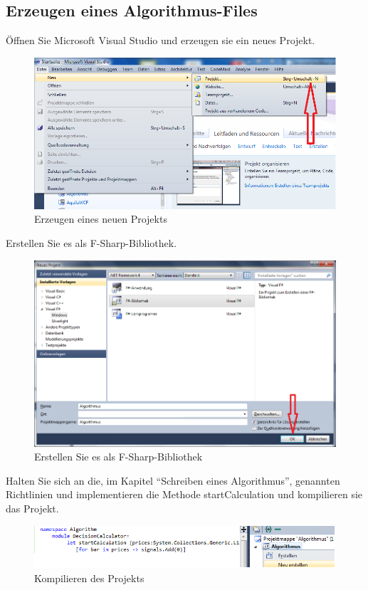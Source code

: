 \subsection{Erzeugen eines Algorithmus-Files}
Öffnen Sie Microsoft Visual Studio und erzeugen sie ein neues Projekt.\\
\begin{figure}[H]
\centering
\includegraphics[width=1\textwidth]{images/newProject.png}
\caption{Erzeugen eines neuen Projekts}
\end{figure} 
\newpage
Erstellen Sie es als \gls{F-Sharp}-Bibliothek.
\begin{figure}[H]
\centering
\includegraphics[width=1\textwidth]{images/createProject.png}
\caption{Erstellen Sie es als \gls{F-Sharp}-Bibliothek}
\end{figure}
Halten Sie sich an die, im Kapitel "`Schreiben eines Algorithmus"', genannten Richtlinien und implementieren die Methode startCalculation und kompilieren sie das Projekt.
\begin{figure}[H]
\centering
\includegraphics[width=1\textwidth]{images/makeFs.png}
\caption{Kompilieren des Projekts}
\end{figure}
\clearpage
